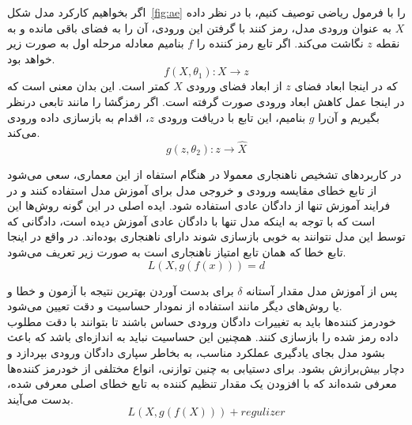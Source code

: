 \documentclass[12pt,a4paper]{report}
\theoremstyle{definition}
\theoremstyle{definition}
\begin{document}
اگر بخواهیم کارکرد مدل شکل~\ref{fig:ae} را با فرمول ریاضی توصیف کنیم، با در نظر داده $X$ به عنوان ورودی مدل، رمز کنند با گرفتن این ورودی، آن را به فضای باقی مانده و به نقطه $z$ نگاشت می‌کند. اگر تابع رمز کننده را $f$ بنامیم معادله مرحله اول به صورت زیر خواهد بود.
\begin{equation}
f(X, \theta_1): X \rightarrow z
\end{equation}
که در اینجا ابعاد فضای $z$ از ابعاد فضای ورودی $X$ کمتر است. این بدان معنی است که در اینجا عمل کاهش ابعاد ورودی صورت گرفته است. اگر رمزگشا را مانند تابعی درنظر بگیریم و آن‌را $g$ بنامیم، این تابع با دریافت ورودی $z$، اقدام به بازسازی داده ورودی می‌کند.
\begin{equation}
	g(z, \theta_2): z \rightarrow \hat{X}
\end{equation}

در کاربردهای تشخیص ناهنجاری معمولا در هنگام استفاه از این معماری، سعی می‌شود از تابع خطای مقایسه ورودی و خروجی مدل برای آموزش مدل استفاده کنند و در فرایند آموزش تنها از دادگان عادی استفاده شود. ایده اصلی در این گونه روش‌ها این است که با توجه به اینکه مدل تنها با دادگان عادی آموزش دیده است، دادگانی که توسط این مدل نتوانند به خوبی بازسازی شوند دارای ناهنجاری بوده‌اند. در واقع در اینجا تابع خطا که همان تابع امتیاز ناهنجاری است به صورت زیر تعریف می‌شود.
\begin{equation}
	L(X, g(f(x))) = d
\end{equation}

پس از آموزش مدل مقدار آستانه $\delta$ برای بدست آوردن بهترین نتیجه با آزمون و خطا و یا روش‌های دیگر مانند استفاده از نمودار حساسیت و دقت تعیین می‌شود. \\

خودرمز کننده‌ها باید به تغییرات دادگان ورودی حساس باشند تا بتوانند با دقت مطلوب داده رمز شده را بازسازی کنند. همچنین این حساسیت نباید به اندازه‌ای باشد که باعث بشود مدل بجای یادگیری عملکرد مناسب، به بخاطر سپاری دادگان ورودی بپردازد و دچار بیش‌برازش بشود. برای دستیابی به چنین توازنی، انواع مختلفی از خودرمز کننده‌ها معرفی شده‌اند که با افزودن یک مقدار تنظیم کننده به تابع خطای اصلی معرفی شده، بدست می‌آیند.
\begin{equation}
	L(X, g(f(X))) + regulizer
\end{equation}
\end{document}
